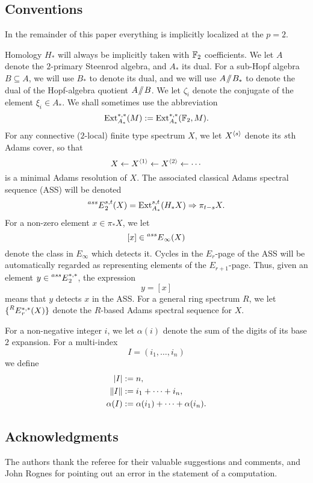 \subsection*{Conventions} In the remainder
of this paper everything is implicitly localized at the $p = 2$.  

Homology $H_*$ will always be implicitly taken with $\mathbb{F}_2$ coefficients.
We let $A$ denote the $2$-primary Steenrod algebra, and $A_*$ its dual.  For a sub-Hopf algebra $B \subseteq A$, we will use $B_*$ to denote its dual, and we will use $A\! \sslash \! B_*$ to denote the dual of the Hopf-algebra quotient $A\! \sslash \! B$.  We let $\zeta_i$ denote the conjugate of the element $\xi_i \in A_*$.  We shall sometimes use the abbreviation
$$ \operatorname{Ext}^{*,*}_{A_*}(M) := \operatorname{Ext}^{*,*}_{A_*}(\mathbb{F}_2, M). $$
For any connective ($2$-local) finite type spectrum $X$, we let $X^{\langle s \rangle}$ denote its $s$th Adams cover, so that
$$ X \leftarrow X^{\langle 1 \rangle} \leftarrow X^{\langle 2 \rangle} \leftarrow \cdots $$
is a minimal Adams resolution of $X$.
The associated classical Adams spectral sequence (ASS) will be denoted
$$ \prescript{ass}{}{E}^{s,t}_2(X) = \operatorname{Ext}_{A_*}^{s,t}(H_*X) \Rightarrow \pi_{t-s} X. $$
For a non-zero element $x \in \pi_*X$, we let 
$$ [x] \in \prescript{ass}{}{E}_\infty(X) $$
denote the class in $E_\infty$ which detects it.  Cycles in the $E_r$-page of the ASS will be automatically regarded as representing elements of the $E_{r+1}$-page.  Thus, given an element $y \in \prescript{ass}{}{E}_2^{*,*}$, the expression
$$ y = [x] $$
means that $y$ detects $x$ in the ASS.  For a general ring spectrum $R$, we let $\{ \prescript{R}{}{E}^{*,*}_r(X) \}$ denote the $R$-based Adams spectral sequence for $X$.

For a non-negative integer $i$, we let $\alpha(i)$ denote the sum of the digits of its base $2$ expansion.
For a multi-index 
$$ I = (i_1, \ldots, i_n) $$
we define
\begin{align*}
\lvert I \rvert & := n, \\
\lVert I \rVert & := i_1 + \cdots + i_n, \\
\alpha(I) & := \alpha(i_1) + \cdots + \alpha(i_n).
\end{align*}

\subsection*{Acknowledgments}  The authors thank the referee for their valuable suggestions and comments, and John Rognes for pointing out an error in the statement of a computation.

